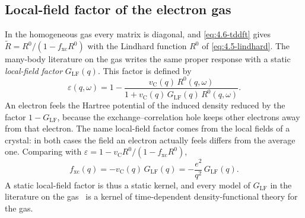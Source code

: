 \subsection{Local-field factor of the electron gas}

In the homogeneous gas every matrix is diagonal, and \cref{eq:4.6-tddft} gives $\tilde R = R^0/(1 - f_{\mathrm{xc}}R^0)$ with the Lindhard function $R^0$ of \cref{eq:4.5-lindhard}. The many-body literature on the gas writes the same proper response with a static \emph{local-field factor} $G_{\mathrm{LF}}(q)$. This factor is defined by
\begin{equation*}
  \varepsilon(q,\omega) = 1 - \frac{v_{\mathrm{C}}(q)\,R^0(q,\omega)}{1 + v_{\mathrm{C}}(q)\,G_{\mathrm{LF}}(q)\,R^0(q,\omega)} .
\end{equation*}
An electron feels the Hartree potential of the induced density reduced by the factor $1 - G_{\mathrm{LF}}$, because the exchange--correlation hole keeps other electrons away from that electron. The name local-field factor comes from the local fields of a crystal: in both cases the field an electron actually feels differs from the average one. Comparing with $\varepsilon = 1 - v_{\mathrm{C}}R^0/(1 - f_{\mathrm{xc}}R^0)$,
\begin{equation}
  f_{\mathrm{xc}}(q) = -v_{\mathrm{C}}(q)\,G_{\mathrm{LF}}(q) = -\frac{e^2}{q^2}\,G_{\mathrm{LF}}(q) .
  \label{eq:4.6-GLF}
\end{equation}
A static local-field factor is thus a static kernel, and every model of $G_{\mathrm{LF}}$ in the literature on the gas~\cite[Chap.~5]{giuliani2005quantum} is a kernel of time-dependent density-functional theory for the gas.

